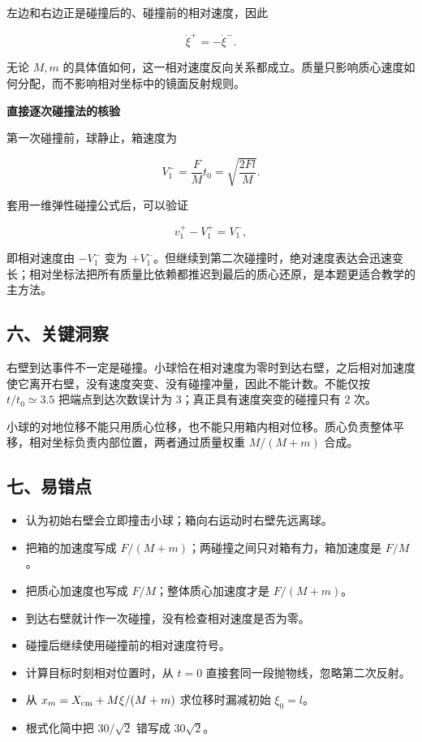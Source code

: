 \documentclass[12pt,a4paper,UTF8]{ctexart}
\newcommand{\tightlist}{\setlength{\itemsep}{0pt}\setlength{\parskip}{0pt}}
\begin{document}
左边和右边正是碰撞后的、碰撞前的相对速度，因此

\[\dot\xi^+=-\dot\xi^-.\]

无论 \(M,m\)
的具体值如何，这一相对速度反向关系都成立。质量只影响质心速度如何分配，而不影响相对坐标中的镜面反射规则。

\textbf{直接逐次碰撞法的核验}

第一次碰撞前，球静止，箱速度为

\[V^-_1=\frac FMt_0=\sqrt{\frac{2Fl}{M}}.\]

套用一维弹性碰撞公式后，可以验证

\[v_1^+-V_1^+=V_1^-,\]

即相对速度由 \(-V_1^-\) 变为
\(+V_1^-\)。但继续到第二次碰撞时，绝对速度表达会迅速变长；相对坐标法把所有质量比依赖都推迟到最后的质心还原，是本题更适合教学的主方法。

\subsection{六、关键洞察}\label{ux516dux5173ux952eux6d1eux5bdf-7}

右壁到达事件不一定是碰撞。小球恰在相对速度为零时到达右壁，之后相对加速度使它离开右壁，没有速度突变、没有碰撞冲量，因此不能计数。不能仅按
\(t/t_0\simeq3.5\) 把端点到达次数误计为
\(3\)；真正具有速度突变的碰撞只有 \(2\) 次。

小球的对地位移不能只用质心位移，也不能只用箱内相对位移。质心负责整体平移，相对坐标负责内部位置，两者通过质量权重
\(M/(M+m)\) 合成。

\subsection{七、易错点}\label{ux4e03ux6613ux9519ux70b9-7}

\begin{itemize}
\tightlist
\item
  认为初始右壁会立即撞击小球；箱向右运动时右壁先远离球。
\item
  把箱的加速度写成 \(F/(M+m)\)；两碰撞之间只对箱有力，箱加速度是
  \(F/M\)。
\item
  把质心加速度也写成 \(F/M\)；整体质心加速度才是 \(F/(M+m)\)。
\item
  到达右壁就计作一次碰撞，没有检查相对速度是否为零。
\item
  碰撞后继续使用碰撞前的相对速度符号。
\item
  计算目标时刻相对位置时，从 \(t=0\)
  直接套同一段抛物线，忽略第二次反射。
\item
  从 \(x_m=X_{\rm cm}+M\xi/(M+m)\) 求位移时漏减初始 \(\xi_0=l\)。
\item
  根式化简中把 \(30/\sqrt2\) 错写成 \(30\sqrt2\)。
\end{itemize}
\end{document}
